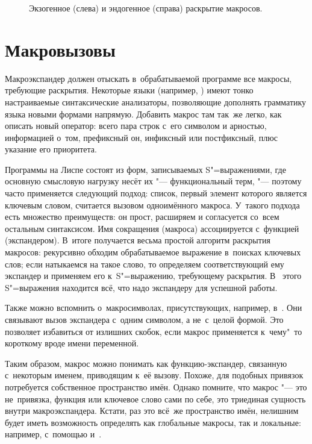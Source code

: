 \begin{figure}\centering

\caption{Экзогенное (слева) и эндогенное (справа) раскрытие макросов.}%
\label{macros/expand/endo/pic:comparison}
\end{figure}


\section{Макровызовы}\label{macros/sect:calling}

Макроэкспандер должен отыскать в~обрабатываемой программе все макросы, требующие
раскрытия. Некоторые языки (например, \cite{car93}) имеют тонко настраиваемые
синтаксические анализаторы, позволяющие дополнять грамматику языка новыми
формами напрямую. Добавить макрос там так~же легко, как описать новый оператор:
всего пара строк с~его символом и арностью, информацией о~том, префиксный он,
инфиксный или постфиксный, плюс указание его приоритета.

Программы на Лиспе состоят из форм, записываемых S"=выражениями, где основную
смысловую нагрузку несёт их  "--- функциональный терм, "--- поэтому
часто применяется следующий подход: список, первый элемент которого является
ключевым словом, считается вызовом одноимённого макроса. У~такого подхода есть
множество преимуществ: он прост, расширяем и согласуется со~всем остальным
синтаксисом. Имя сокращения (макроса) ассоциируется с~функцией (экспандером).
В~итоге получается весьма простой алгоритм раскрытия макросов: рекурсивно
обходим обрабатываемое выражение в~поисках ключевых слов; если натыкаемся на
такое слово, то определяем соответствующий ему экспандер и применяем его
к~S"=выражению, требующему раскрытия. В~ этого S"=выражения находится
всё, что надо экспандеру для успешной работы.

Также можно вспомнить о~макросимволах, присутствующих, например,
в~{\CommonLisp}. Они связывают вызов экспандера с~одним символом, а не~с~целой
формой. Это позволяет избавиться от излишних скобок, если макрос применяется
к~чему"~то короткому вроде имени переменной.

Таким образом, макрос можно понимать как функцию-экспандер, связанную
с~некоторым именем, приводящим к~её вызову. Похоже, для подобных привязок
потребуется собственное пространство имён. Однако помните, что макрос "--- это
не~привязка, функция или ключевое слово сами по себе, это триединая сущность
внутри макроэкспандера. Кстати, раз это всё~же пространство имён, нелишним будет
иметь возможность определять как глобальные макросы, так и локальные: например,
с~помощью  и~.

